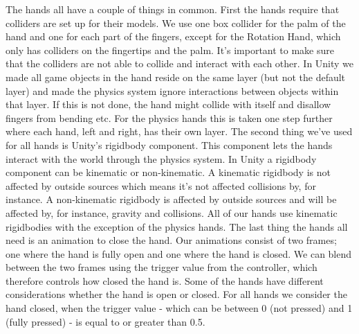 \begin{table}[H]
\centering
\caption{The hand prototypes and their filters.}
\label{tab:handPrototypes}
\end{table}

The hands all have a couple of things in common. First the hands require that colliders are set up for their models. We use one box collider for the palm of the hand and one for each part of the fingers, except for the Rotation Hand, which only has colliders on the fingertips and the palm. It's important to make sure that the colliders are not able to collide and interact with each other. In Unity we made all game objects in the hand reside on the same layer (but not the default layer) and made the physics system ignore interactions between objects within that layer. If this is not done, the hand might collide with itself and disallow fingers from bending etc. For the physics hands this is taken one step further where each hand, left and right, has their own layer. The second thing we've used for all hands is Unity's rigidbody component. This component lets the hands interact with the world through the physics system. In Unity a rigidbody component can be kinematic or non-kinematic. A kinematic rigidbody is not affected by outside sources which means it's not affected collisions by, for instance. A non-kinematic rigidbody is affected by outside sources and will be affected by, for instance, gravity and collisions. All of our hands use kinematic rigidbodies with the exception of the physics hands. The last thing the hands all need is an animation to close the hand. Our animations consist of two frames; one where the hand is fully open and one where the hand is closed. We can blend between the two frames using the trigger value from the controller, which therefore controls how closed the hand is. Some of the hands have different considerations whether the hand is open or closed. For all hands we consider the hand closed, when the trigger value - which can be between 0 (not pressed) and 1 (fully pressed) - is equal to or greater than 0.5.

